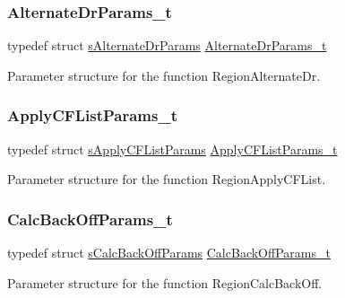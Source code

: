 \subsubsection{\texorpdfstring{Alternate\+Dr\+Params\+\_\+t}{AlternateDrParams\_t}}
{\footnotesize\ttfamily typedef struct \hyperlink{structsAlternateDrParams}{s\+Alternate\+Dr\+Params} \hyperlink{group__REGION_ga001ea4338d1c83f4c785b49d7ad2d696}{Alternate\+Dr\+Params\+\_\+t}}

Parameter structure for the function Region\+Alternate\+Dr. \mbox{\label{group__REGION_ga71588e9ad07e34b78fa91d51881fd3c6}} 
\subsubsection{\texorpdfstring{Apply\+C\+F\+List\+Params\+\_\+t}{ApplyCFListParams\_t}}
{\footnotesize\ttfamily typedef struct \hyperlink{structsApplyCFListParams}{s\+Apply\+C\+F\+List\+Params} \hyperlink{group__REGION_ga71588e9ad07e34b78fa91d51881fd3c6}{Apply\+C\+F\+List\+Params\+\_\+t}}

Parameter structure for the function Region\+Apply\+C\+F\+List. \mbox{\label{group__REGION_ga7c5c9a8da174e6679eded8257dc92fd9}} 
\subsubsection{\texorpdfstring{Calc\+Back\+Off\+Params\+\_\+t}{CalcBackOffParams\_t}}
{\footnotesize\ttfamily typedef struct \hyperlink{structsCalcBackOffParams}{s\+Calc\+Back\+Off\+Params} \hyperlink{group__REGION_ga7c5c9a8da174e6679eded8257dc92fd9}{Calc\+Back\+Off\+Params\+\_\+t}}

Parameter structure for the function Region\+Calc\+Back\+Off. \mbox{\label{group__REGION_ga6d24f7da136006410827dfb29f6b9b9e}} 
